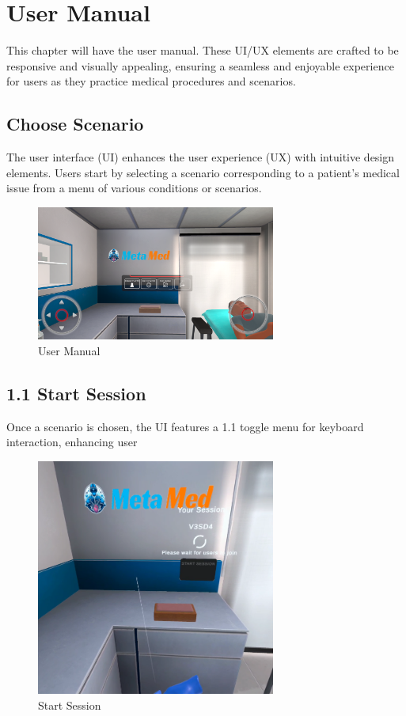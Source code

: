 \chapter{User Manual}
\label{ch:manual}
This chapter will have the user manual. These UI/UX elements are crafted to be responsive and visually appealing, ensuring a seamless and enjoyable experience for users as they practice medical procedures and scenarios.
\section{Choose Scenario}
The user interface (UI) enhances the user experience (UX) with intuitive design elements. Users start by selecting a scenario corresponding to a patient's medical issue from a menu of various conditions or scenarios.
\begin{figure}[h]
    \centering
    \includegraphics[width=0.7\textwidth, height=0.3\textheight]{Images/User Manual.png}
    \caption{User Manual}
    \label{fig:User Manual}
\end{figure}

\section{1.1 Start Session}
Once a scenario is chosen, the UI features a 1.1 toggle menu for keyboard interaction, enhancing user \begin{figure}[h]
	\centering
	\includegraphics[width=0.7\textwidth, height=0.3\textheight]{Images/start session.png}
	\caption{Start Session}
	\label{fig:Start Session}
\end{figure}

